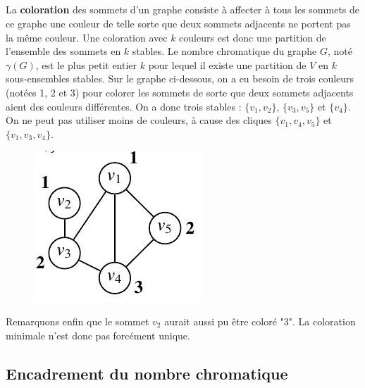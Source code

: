 \subsection*{}
La \textbf{coloration} des sommets d'un graphe consiste à affecter à tous les sommets de ce graphe
une couleur de telle sorte que deux sommets adjacents ne portent pas la même couleur. Une
coloration avec $ k $ couleurs est donc une partition de l'ensemble des sommets en $ k $ stables.
Le nombre chromatique du graphe $ G $, noté $ \gamma (G) $, est le plus petit entier $ k $ pour lequel il
existe une partition de $ V $ en $ k $ sous-ensembles stables.
Sur le graphe ci-dessous, on a eu besoin de trois couleurs (notées 1, 2 et 3) pour colorer les
sommets de sorte que deux sommets adjacents aient des couleurs différentes. On a donc
trois stables : $ \{v_{1}, v_{2} \}$, $ \{v_{3}, v_{5}\} $ et $ \{v_{4} \} $. On ne peut pas utiliser moins de couleurs, à cause
des cliques $ \{v_{1},v_{4}, v_{5}\}$ et $ \{v_{1}, v_{3}, v_{4}\} $.

\begin{figure}[h]
\centering
\includegraphics[width=0.3\linewidth]{images/graph19}
\end{figure}

Remarquons enfin que le sommet $ v_{2} $ aurait aussi pu être coloré "3". La coloration minimale n'est donc pas forcément unique.

\subsection*{Encadrement du nombre chromatique}
